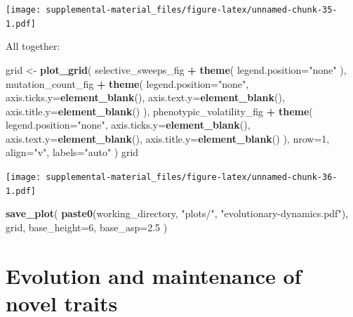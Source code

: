 \documentclass[]{book}
\newenvironment{Shaded}{\begin{snugshade}}{\end{snugshade}}
\newcommand{\DataTypeTok}[1]{\textcolor[rgb]{0.13,0.29,0.53}{#1}}
\newcommand{\DecValTok}[1]{\textcolor[rgb]{0.00,0.00,0.81}{#1}}
\newcommand{\FloatTok}[1]{\textcolor[rgb]{0.00,0.00,0.81}{#1}}
\newcommand{\KeywordTok}[1]{\textcolor[rgb]{0.13,0.29,0.53}{\textbf{#1}}}
\newcommand{\NormalTok}[1]{#1}
\newcommand{\OperatorTok}[1]{\textcolor[rgb]{0.81,0.36,0.00}{\textbf{#1}}}
\newcommand{\StringTok}[1]{\textcolor[rgb]{0.31,0.60,0.02}{#1}}
\begin{document}
\texttt{[image: supplemental-material\_files/figure-latex/unnamed-chunk-35-1.pdf]}

All together:

\begin{Shaded}
\begin{Highlighting}[]
\NormalTok{grid <-}\StringTok{ }\KeywordTok{plot_grid}\NormalTok{(}
\NormalTok{  selective_sweeps_fig }\OperatorTok{+}\StringTok{ }\KeywordTok{theme}\NormalTok{(}
    \DataTypeTok{legend.position=}\StringTok{"none"}
\NormalTok{  ),}
\NormalTok{  mutation_count_fig }\OperatorTok{+}\StringTok{ }\KeywordTok{theme}\NormalTok{(}
    \DataTypeTok{legend.position=}\StringTok{"none"}\NormalTok{,}
    \DataTypeTok{axis.ticks.y=}\KeywordTok{element_blank}\NormalTok{(),}
    \DataTypeTok{axis.text.y=}\KeywordTok{element_blank}\NormalTok{(),}
    \DataTypeTok{axis.title.y=}\KeywordTok{element_blank}\NormalTok{()}
\NormalTok{  ),}
\NormalTok{  phenotypic_volatility_fig }\OperatorTok{+}\StringTok{ }\KeywordTok{theme}\NormalTok{(}
    \DataTypeTok{legend.position=}\StringTok{"none"}\NormalTok{,}
    \DataTypeTok{axis.ticks.y=}\KeywordTok{element_blank}\NormalTok{(),}
    \DataTypeTok{axis.text.y=}\KeywordTok{element_blank}\NormalTok{(),}
    \DataTypeTok{axis.title.y=}\KeywordTok{element_blank}\NormalTok{()}
\NormalTok{  ),}
  \DataTypeTok{nrow=}\DecValTok{1}\NormalTok{,}
  \DataTypeTok{align=}\StringTok{"v"}\NormalTok{,}
  \DataTypeTok{labels=}\StringTok{"auto"}
\NormalTok{)}
\NormalTok{grid}
\end{Highlighting}
\end{Shaded}

\texttt{[image: supplemental-material\_files/figure-latex/unnamed-chunk-36-1.pdf]}

\begin{Shaded}
\begin{Highlighting}[]
\KeywordTok{save_plot}\NormalTok{(}
   \KeywordTok{paste0}\NormalTok{(working_directory, }\StringTok{"plots/"}\NormalTok{, }\StringTok{"evolutionary-dynamics.pdf"}\NormalTok{),}
\NormalTok{   grid,}
   \DataTypeTok{base_height=}\DecValTok{6}\NormalTok{,}
   \DataTypeTok{base_asp=}\FloatTok{2.5}
\NormalTok{)}
\end{Highlighting}
\end{Shaded}

\hypertarget{evolution-and-maintenance-of-novel-traits}{%
\chapter{Evolution and maintenance of novel traits}\label{evolution-and-maintenance-of-novel-traits}}
\end{document}
